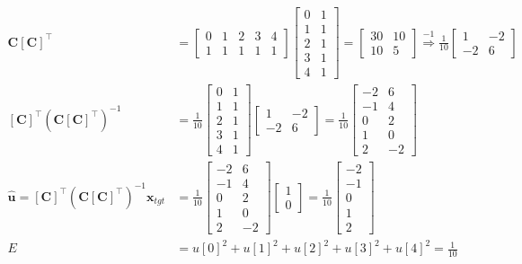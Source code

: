 \documentclass[]{article}
\newcommand{\unit}[1]{\bm{\hat{#1}}}
\newcommand{\tpose}[1]{\left[#1\right]^{\! \top} \!\!}
\begin{document}
\begin{align}
	\bm{C} \tpose{\bm{C}} &=
	\begin{bmatrix}
	0 & 1 & 2 & 3 & 4 \\
	1 & 1 & 1 & 1 & 1
	\end{bmatrix}
	\begin{bmatrix}
	0 & 1 \\
	1 & 1 \\
	2 & 1 \\
	3 & 1 \\
	4 & 1
	\end{bmatrix} =
	\begin{bmatrix}
	30 & 10 \\
	10 & 5
	\end{bmatrix}
	\overset{-1}{\Longrightarrow} \frac{1}{10} \begin{bmatrix}
	1 & -2 \\
	-2 & 6
	\end{bmatrix} \\
	\tpose{\bm{C}} (\bm{C} \tpose{\bm{C}})^{-1} &= \frac{1}{10} \begin{bmatrix}
	0 & 1 \\
	1 & 1 \\
	2 & 1 \\
	3 & 1 \\
	4 & 1
	\end{bmatrix}
	\begin{bmatrix}
	1 & -2 \\
	-2 & 6
	\end{bmatrix} =
	\frac{1}{10} \begin{bmatrix}
	-2 & 6 \\
	-1 & 4 \\
	0 & 2 \\
	1 & 0 \\
	2 & -2
	\end{bmatrix} \\
	\unit{u} = \tpose{\bm{C}} (\bm{C} \tpose{\bm{C}})^{-1} \bm{x}_{tgt} &=
	\frac{1}{10} \begin{bmatrix}
	-2 & 6 \\
	-1 & 4 \\
	0 & 2 \\
	1 & 0 \\
	2 & -2
	\end{bmatrix}
	\begin{bmatrix}
	1 \\
	0
	\end{bmatrix} =
	\frac{1}{10} \begin{bmatrix}
	-2 \\
	-1 \\
	0 \\
	1 \\
	2
	\end{bmatrix} \\
	E &= u[0]^2 + u[1]^2 + u[2]^2 + u[3]^2 + u[4]^2 = \frac{1}{10}
\end{align}
\end{document}
